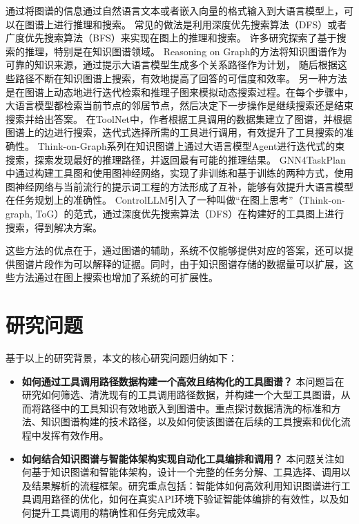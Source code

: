 通过将图谱的信息通过自然语言文本或者嵌入向量的格式输入到大语言模型上，可以在图谱上进行推理和搜索。
常见的做法是利用深度优先搜索算法（DFS）或者广度优先搜索算法（BFS）来实现在图上的推理和搜索。
许多研究探索了基于搜索的推理，特别是在知识图谱领域。
Reasoning on Graph\cite{Luo2023}的方法将知识图谱作为可靠的知识来源，通过提示大语言模型生成多个关系路径作为计划，
随后根据这些路径不断在知识图谱上搜索，有效地提高了回答的可信度和效率。
另一种方法是在图谱上动态地进行迭代检索和推理子图来模拟动态搜索过程\cite{Liu2024, Sun2023, Ma2024}。在每个步骤中，大语言模型都检索当前节点的邻居节点，然后决定下一步操作是继续搜索还是结束搜索并给出答案。
在ToolNet\cite{Liu2024}中，作者根据工具调用的数据集建立了图谱，并根据图谱上的边进行搜索，迭代式选择所需的工具进行调用，有效提升了工具搜索的准确性。
Think-on-Graph系列\cite{Sun2023,Ma2024}在知识图谱上通过大语言模型Agent进行迭代式的束搜索，探索发现最好的推理路径，并返回最有可能的推理结果。
GNN4TaskPlan中\cite{wucan2024}通过构建工具图和使用图神经网络，实现了非训练和基于训练的两种方式，使用图神经网络与当前流行的提示词工程的方法形成了互补，能够有效提升大语言模型在任务规划上的准确性。
ControlLLM\cite{Liu2023a}引入了一种叫做“在图上思考”（Think-on-graph, ToG）的范式，通过深度优先搜索算法（DFS）在构建好的工具图上进行搜索，得到解决方案。

这些方法的优点在于，通过图谱的辅助，系统不仅能够提供对应的答案，还可以提供图谱片段作为可以解释的证据。同时，由于知识图谱存储的数据量可以扩展，这些方法通过在图上搜索也增加了系统的可扩展性。

\section{研究问题}

基于以上的研究背景，本文的核心研究问题归纳如下：
\begin{itemize}
    \item \textbf{如何通过工具调用路径数据构建一个高效且结构化的工具图谱？}
   本问题旨在研究如何筛选、清洗现有的工具调用路径数据，并构建一个大型工具图谱，从而将路径中的工具知识有效地嵌入到图谱中。重点探讨数据清洗的标准和方法、知识图谱构建的技术路径，以及如何使该图谱在后续的工具搜索和优化流程中发挥有效作用。
    \item \textbf{如何结合知识图谱与智能体架构实现自动化工具编排和调用？}
   本问题关注如何基于知识图谱和智能体架构，设计一个完整的任务分解、工具选择、调用以及结果解析的流程框架。研究重点包括：智能体如何高效利用知识图谱进行工具调用路径的优化，如何在真实API环境下验证智能体编排的有效性，以及如何提升工具调用的精确性和任务完成效率。
\end{itemize}

